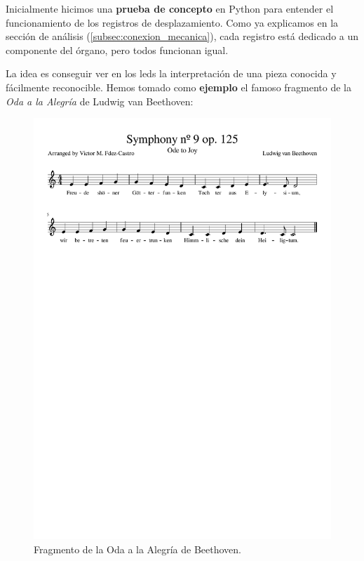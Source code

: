 Inicialmente hicimos una \textbf{prueba de concepto} en Python para entender el funcionamiento de los registros de desplazamiento. Como ya explicamos en la sección de análisis (\ref{subsec:conexion_mecanica}), cada registro está dedicado a un componente del órgano, pero todos funcionan igual.

La idea es conseguir ver en los \acrshort{led}s la interpretación de una pieza conocida y fácilmente reconocible. Hemos tomado como \textbf{ejemplo} el famoso fragmento de la \textit{Oda a la Alegría} de Ludwig van Beethoven:

\smallskip

\begin{figure}[H]
	\noindent \begin{centering}
		\includegraphics[width=\linewidth*3/4]{capitulo5/beethoven_1voz}
		\par\end{centering}
	\smallskip
	\caption{\label{fig:beethoven_1voz} Fragmento de la Oda a la Alegría de Beethoven.}
\end{figure}

